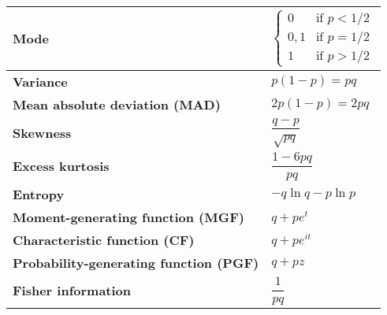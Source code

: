 \begin{alternateColorTable}
\begin{longtable}{|m{6cm}|p{9cm}|}
    \textbf{Mode} & 
    ${\displaystyle {\begin{cases}0&{\text{if }}p<1/2\\0,1&{\text{if }}p=1/2\\1&{\text{if }}p>1/2\end{cases}}}$
    \\ \hline

    \textbf{Variance} &
    ${\displaystyle p(1-p)=pq}$
    \\ \hline

    \textbf{Mean absolute deviation (MAD)} &
    ${\displaystyle 2p(1-p)=2pq}$
    \\[1ex] \hline

    \textbf{Skewness} &
    ${\displaystyle {\dfrac {q-p}{\sqrt {pq}}}}$
    \\ \hline

    \textbf{Excess kurtosis} &
    ${\displaystyle {\dfrac {1-6pq}{pq}}}$
    \\ \hline

    \textbf{Entropy} &
    ${\displaystyle -q\ln q-p\ln p}$
    \\[1ex] \hline

    \textbf{Moment-generating function (MGF)} &
    ${\displaystyle q+pe^{t}}$
    \\[1ex] \hline

    \textbf{Characteristic function (CF)} &
    ${\displaystyle q+pe^{it}}$
    \\[1ex] \hline

    \textbf{Probability-generating function (PGF)} &
    ${\displaystyle q+pz}$
    \\[1ex] \hline

    \textbf{Fisher information} &
    ${\displaystyle {\dfrac {1}{pq}}}$
    \\[1ex] \hline


\end{longtable}
\renewcommand{\arraystretch}{1}
\end{alternateColorTable}























